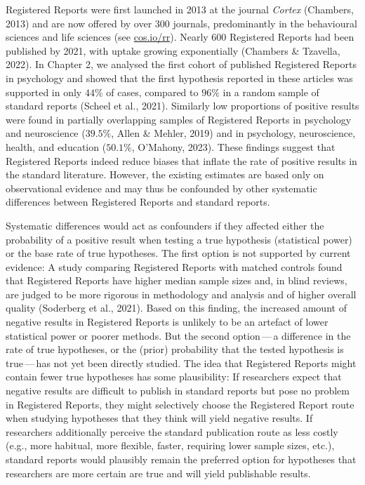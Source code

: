 \documentclass[
  british,
  a4paper,
  ,man,mask,floatsintext]{apa6}
\begin{document}
Registered Reports were first launched in 2013 at the journal \emph{Cortex} (Chambers, 2013) and are now offered by over 300 journals, predominantly in the behavioural sciences and life sciences (see \url{cos.io/rr}).
Nearly 600 Registered Reports had been published by 2021, with uptake growing exponentially (Chambers \& Tzavella, 2022).
In Chapter 2, we analysed the first cohort of published Registered Reports in psychology and showed that the first hypothesis reported in these articles was supported in only \(44\%\) of cases, compared to \(96\%\) in a random sample of standard reports (Scheel et al., 2021).
Similarly low proportions of positive results were found in partially overlapping samples of Registered Reports in psychology and neuroscience (\(39.5\%\), Allen \& Mehler, 2019) and in psychology, neuroscience, health, and education (\(50.1\%\), O'Mahony, 2023).
These findings suggest that Registered Reports indeed reduce biases that inflate the rate of positive results in the standard literature.
However, the existing estimates are based only on observational evidence and may thus be confounded by other systematic differences between Registered Reports and standard reports.

Systematic differences would act as confounders if they affected either the probability of a positive result when testing a true hypothesis (statistical power) or the base rate of true hypotheses.
The first option is not supported by current evidence:
A study comparing Registered Reports with matched controls found that Registered Reports have higher median sample sizes and, in blind reviews, are judged to be more rigorous in methodology and analysis and of higher overall quality (Soderberg et al., 2021).
Based on this finding, the increased amount of negative results in Registered Reports is unlikely to be an artefact of lower statistical power or poorer methods.
But the second option\(\,\)---\(\,\)a difference in the rate of true hypotheses, or the (prior) probability that the tested hypothesis is true\(\,\)---\(\,\)has not yet been directly studied.
The idea that Registered Reports might contain fewer true hypotheses has some plausibility:
If researchers expect that negative results are difficult to publish in standard reports but pose no problem in Registered Reports, they might selectively choose the Registered Report route when studying hypotheses that they think
will yield negative results.
If researchers additionally perceive the standard publication route as less costly (e.g., more habitual, more flexible, faster, requiring lower sample sizes, etc.), standard reports would plausibly remain the preferred option for hypotheses that researchers are more certain are true and will yield publishable results.
\end{document}
